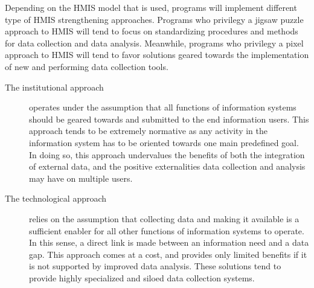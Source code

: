 Depending on the HMIS model that is used, programs will implement different type of HMIS strengthening approaches. Programs who privilegy a jigsaw puzzle approach to HMIS will tend to focus on standardizing procedures and methods for data collection and data analysis. Meanwhile, programs who privilegy a pixel approach to HMIS will tend to favor solutions geared towards the implementation of new and performing data collection tools.

\begin{description}
\item[The institutional approach] operates under the assumption that all functions of information systems should be geared towards and submitted to the end information users. This approach tends to be extremely normative as any activity in the information system has to be oriented towards one main predefined goal. In doing so, this approach undervalues the benefits of both the integration of external data, and the positive externalities data collection and analysis may have on multiple users.



\item[The technological approach] relies on the assumption that collecting data and making it available is a sufficient enabler for all other functions of information systems to operate. In this sense, a direct link is made between an information need and a data gap. This approach comes at a cost, and provides only limited benefits if it is not supported by improved data analysis. These solutions tend to provide highly specialized and siloed data collection systems.

\end{description}

